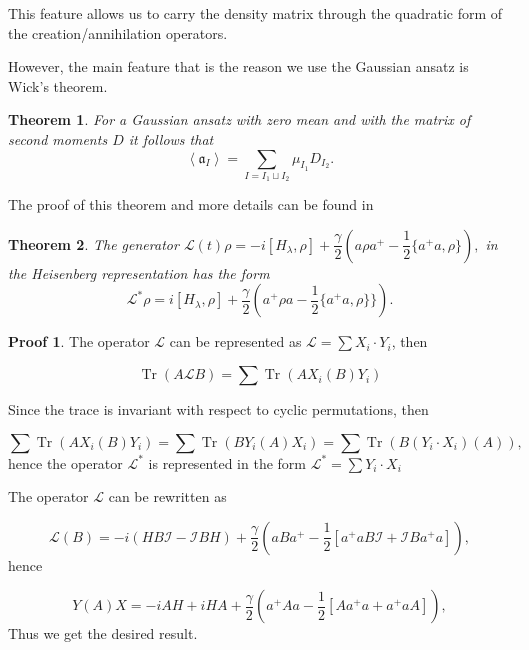 \documentclass[12pt]{article}
\newtheorem{theorem}{Theorem}
\theoremstyle{definition}
\newtheorem*{demo}{Proof}
\newcommand\Tr{\operatorname{Tr}}
\newcommand\bra{\left<}
\newcommand\ket{\right>}
\newcommand{\braket}[1]{\bra#1\ket}
\newcommand{\mf}[1]{\mathfrak{#1}}
\def\ga {\gamma}
\def\la {\lambda}
\begin{document}
	This feature allows us to carry the density matrix through the quadratic form of the creation/annihilation operators.
	
	However, the main feature that is the reason we use the Gaussian ansatz is Wick's theorem.
	
	\begin{theorem}
		\label{th:IW0}
		For a Gaussian ansatz with zero mean and with the matrix of second moments $D$ it follows that 
		\begin{equation*}
			\braket{\mf{a}_I} = \sum\limits_{I = I_1 \sqcup I_2}\mu_{I_1}D_{I_2}.
		\end{equation*}
	\end{theorem}
	The proof of this theorem and more details can be found in \cite{NosalTeretenkov}
	
	
	
	
	
	\begin{theorem}
		\label{th:HeiGenerator}
		The generator $\mathcal{L}(t)\rho = -i[H_{\lambda},\rho] + \dfrac{\ga}{2}(a\rho a^+ - \dfrac12\{a^+a,\rho\}),$ in the Heisenberg representation has the form 
		\begin{equation*}
			\mathcal{L}^*\rho = i[H_{\la},\rho]  + \dfrac{\ga}{2}(a^+\rho a - \dfrac{1}{2}\{a^+a,\rho\}\}).
		\end{equation*}
	\end{theorem}
	
	\begin{demo}
		The operator $\mathcal{L}$ can be represented as $\mathcal{L} = \sum X_i\cdot Y_i$, then 
		
		\begin{equation*}
			\Tr(A\mathcal{L}B) = \sum\Tr(AX_i(B)Y_i)
		\end{equation*}
		
		Since the trace is invariant with respect to cyclic permutations, then 	
		
		\begin{equation*}
			\sum\Tr(AX_i(B) Y_i) = \sum\Tr(B Y_i(A)X_i) = \sum\Tr(B(Y_i\cdot X_i)(A)),
		\end{equation*}
		hence the operator $\mathcal{L}^*$ is represented in the form $\mathcal{L}^* = \sum Y_i \cdot X_i$
		
		
		The operator $\mathcal{L}$ can be rewritten as
		
		\begin{equation*}
			\mathcal{L}(B) = -i(HB\mathcal{I} - \mathcal{I}B H) + \dfrac{\ga}{2}(aB a^+ - \dfrac{1}{2}[a^+aB\mathcal{I} + \mathcal{I}B a^+a]),
		\end{equation*}
		hence
		
		\begin{equation*}
			Y(A)X = -iAH + iHA + \dfrac{\ga}{2}(a^+Aa - \dfrac{1}{2}[Aa^+a + a^+aA]),	
		\end{equation*}
		Thus we get the desired result.
	\end{demo}
	
\end{document}
